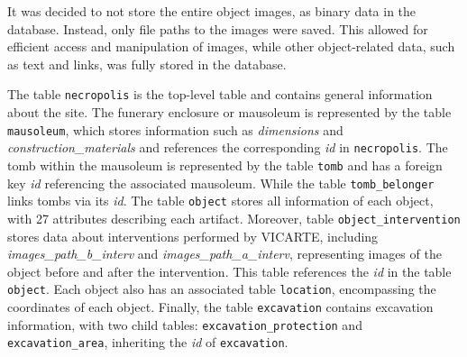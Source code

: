 It was decided to not store the entire object images, as binary data in the database. Instead, only file paths to the images were saved. This allowed for efficient access and manipulation of images, while other object-related data, such as text and links, was fully stored in the database.



The table \texttt{necropolis} is the top-level table and contains general information about the site.  
The funerary enclosure or mausoleum is represented by the table \texttt{mausoleum}, which stores information such as \emph{dimensions} and \emph{construction\_materials} and references the corresponding \emph{id} in \texttt{necropolis}. The tomb within the mausoleum is represented by the table \texttt{tomb} and has a foreign key \emph{id} referencing the associated mausoleum.  
While the table \texttt{tomb\_belonger} links tombs via its \emph{id}. The table \texttt{object} stores all information of each object, with 27 attributes describing each artifact. 
Moreover, table \texttt{object\_intervention} stores data about interventions performed by \gls{VICARTE}, including \emph{images\_path\_b\_interv} and \emph{images\_path\_a\_interv}, representing images of the object before and after the intervention. This table references the \emph{id} in the table \texttt{object}. Each object also has an associated table \texttt{location}, encompassing the coordinates of each object.  
Finally, the table \texttt{excavation} contains excavation information, with two child tables: \texttt{excavation\_protection} and \texttt{excavation\_area}, inheriting the \emph{id} of \texttt{excavation}.  

